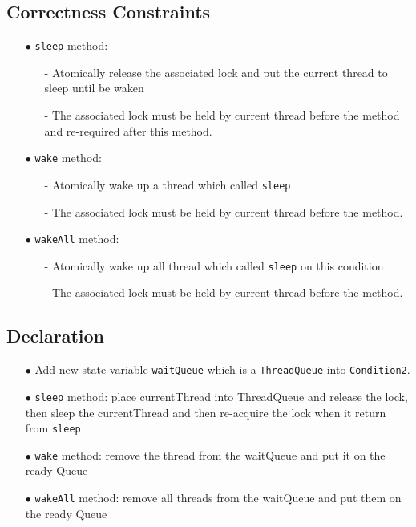\documentclass{article}
\begin{document}
\subsection{Correctness Constraints}
\begin{enumerate}
	\item[$\bullet$] \texttt{sleep} method:
		\begin{enumerate}
			\item[-] Atomically release the associated lock and put the current thread to sleep until be waken
			\item[-] The associated lock must be held by current thread before the method and re-required after this method.
		\end{enumerate}
	\item[$\bullet$] \texttt{wake} method:
		\begin{enumerate}
			\item[-] Atomically wake up a thread which called \texttt{sleep}
			\item[-] The associated lock must be held by current thread before the method.
		\end{enumerate}
	\item[$\bullet$] \texttt{wakeAll} method:
		\begin{enumerate}
			\item[-] Atomically wake up all thread which called \texttt{sleep} on this condition
			\item[-] The associated lock must be held by current thread before the method.
		\end{enumerate}
\end{enumerate}
\subsection{Declaration}
\begin{enumerate}
	\item[$\bullet$] Add new state variable \texttt{waitQueue} which is a \texttt{ThreadQueue} into \texttt{Condition2}.
	\item[$\bullet$] \texttt{sleep} method: place currentThread into ThreadQueue and release the lock, then sleep the currentThread and then 
		re-acquire the lock when it return from \texttt{sleep}
	\item[$\bullet$] \texttt{wake} method: remove the thread from the waitQueue and put it on the ready Queue
	\item[$\bullet$] \texttt{wakeAll} method: remove all threads from the waitQueue and put them on the ready Queue
\end{enumerate}
\end{document}
